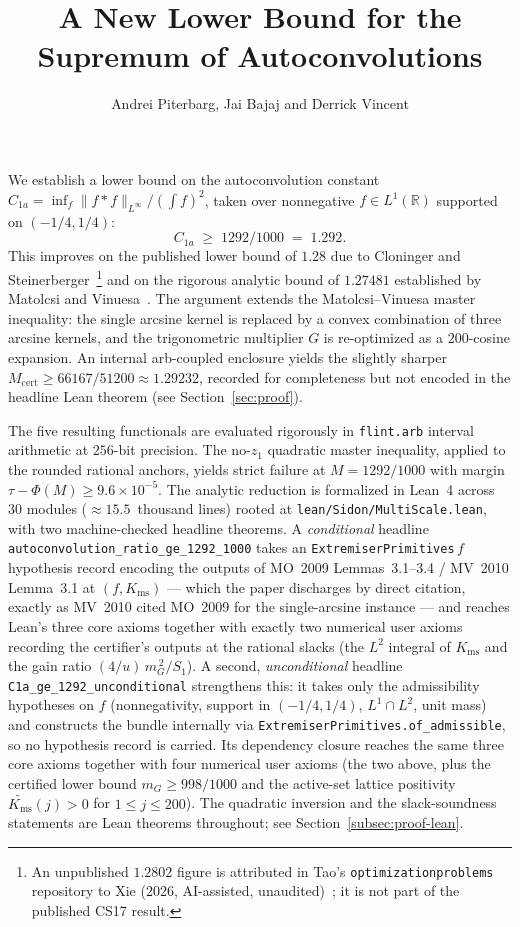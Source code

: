\documentclass[11pt, letterpaper]{article}
\title{\texorpdfstring{%
  A New Lower Bound for the\\
  Supremum of Autoconvolutions
}{A New Lower Bound for the Supremum of Autoconvolutions}}
\author{Andrei Piterbarg, Jai Bajaj and Derrick Vincent}
\date{}
\renewenvironment{abstract}{%
  \vspace{2.6ex plus 0.8ex minus 0.3ex}%
  \begin{center}{\normalfont\Large\bfseries\abstractname}\end{center}%
  \vspace{1.4ex}%
  \small\quotation
}{%
  \endquotation
}
\theoremstyle{paperplain}
\theoremstyle{paperdef}
\newcommand{\R}{\mathbb{R}}
\newcommand{\Linf}{L^\infty}
\newcommand{\Kms}{K_{\mathrm{ms}}}
\newcommand{\Mcert}{M_{\mathrm{cert}}}
\begin{document}
\maketitle

\begin{abstract}
We establish a lower bound on the autoconvolution constant
$C_{1a}=\inf_f \|f*f\|_{\Linf}/(\int f)^2$, taken over nonnegative
$f\in L^1(\R)$ supported on $(-1/4,1/4)$:
\[
  C_{1a}\;\ge\;1292/1000\;=\;1.292.
\]
This improves on the published lower bound of $1.28$ due to
Cloninger and Steinerberger~\cite{CS17}\footnote{An unpublished
$1.2802$ figure is attributed in Tao's
\texttt{optimizationproblems} repository to Xie (2026, AI-assisted,
unaudited)~\cite{Xie26}; it is not part of the published CS17
result.} and on the rigorous analytic bound of $1.27481$ established
by Matolcsi and Vinuesa~\cite{MV10}.  The argument extends the
Matolcsi--Vinuesa master inequality: the single arcsine kernel is
replaced by a convex combination of three arcsine kernels, and the
trigonometric multiplier $G$ is re-optimized as a $200$-cosine
expansion.  An internal arb-coupled enclosure yields the slightly
sharper $\Mcert\ge 66167/51200\approx 1.29232$, recorded for
completeness but not encoded in the headline Lean theorem (see
Section~\ref{sec:proof}).

The five resulting functionals are evaluated rigorously in
\texttt{flint.arb} interval arithmetic at $256$-bit precision.  The
no-$z_1$ quadratic master inequality, applied to the rounded rational
anchors, yields strict failure at $M=1292/1000$ with margin
$\tau-\Phi(M)\ge 9.6\times 10^{-5}$.  The analytic reduction is
formalized in Lean~4 across $30$ modules ($\approx 15.5$~thousand
lines) rooted at \texttt{lean/Sidon/MultiScale.lean}, with two
machine-checked headline theorems.  A \emph{conditional} headline
\texttt{autoconvolution\_ratio\_ge\_1292\_1000} takes an
\texttt{ExtremiserPrimitives}\,$f$ hypothesis record encoding the
outputs of MO~2009 Lemmas~3.1--3.4 / MV~2010 Lemma~3.1 at
$(f,\Kms)$ --- which the paper discharges by direct citation, exactly
as MV~2010 cited MO~2009 for the single-arcsine instance --- and
reaches Lean's three core axioms together with exactly two numerical
user axioms recording the certifier's outputs at the rational slacks
(the $L^2$ integral of $\Kms$ and the gain ratio $(4/u)\,m_G^{\,2}/S_1$).
A second, \emph{unconditional} headline
\texttt{C1a\_ge\_1292\_unconditional} strengthens this: it takes only
the admissibility hypotheses on $f$ (nonnegativity, support in
$(-1/4,1/4)$, $L^1\cap L^2$, unit mass) and constructs the bundle
internally via \texttt{ExtremiserPrimitives.of\_admissible}, so no
hypothesis record is carried.  Its dependency closure reaches the
same three core axioms together with four numerical user axioms (the
two above, plus the certified lower bound $m_G\ge 998/1000$ and the
active-set lattice positivity $\widetilde{\Kms}(j)>0$ for
$1\le j\le 200$).  The quadratic inversion and the slack-soundness
statements are Lean theorems throughout; see
Section~\ref{subsec:proof-lean}.
\end{abstract}
\end{document}
